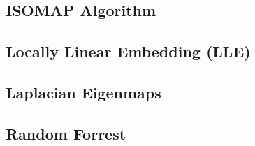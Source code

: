 \subsection*{ISOMAP Algorithm}
\subsection*{Locally Linear Embedding (LLE)}
\subsection*{Laplacian Eigenmaps}
\subsection*{Random Forrest}


%
%
%
%
%
%
